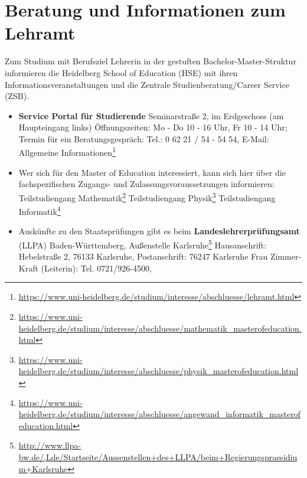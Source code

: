 \section{Beratung und Informationen zum Lehramt}
\label{lehramtkontakte}

Zum Studium mit Berufsziel Lehrerin in der gestuften Bachelor-Master-Struktur informieren die Heidelberg School of Education (HSE) mit ihren Informationsveranstaltungen und die Zentrale Studienberatung/Career Service (ZSB).
\begin{itemize}
    \item \textbf{Service Portal für Studierende} \newline
          Seminarstraße 2, im Erdgeschoss (am Haupteingang links)
          Öffnungszeiten: Mo - Do 10 - 16 Uhr, Fr 10 - 14 Uhr; \newline
          Termin für ein Beratungsgespräch: Tel.: 0 62 21 / 54 - 54 54, E-Mail:  \newline
          Allgemeine Informationen\footnote{\url{https://www.uni-heidelberg.de/studium/interesse/abschluesse/lehramt.html}}

    \item Wer sich für den Master of Education interessiert, kann sich hier über die fachspezifischen Zugangs- und Zulassungsvoraussetzungen informieren: \newline
          Teilstudiengang Mathematik\footnote{\url{https://www.uni-heidelberg.de/studium/interesse/abschluesse/mathematik_masterofeducation.html}} \newline
          Teilstudiengang Physik\footnote{\url{https://www.uni-heidelberg.de/studium/interesse/abschluesse/physik_masterofeducation.html}} \newline
          Teilstudiengang Informatik\footnote{\url{https://www.uni-heidelberg.de/studium/interesse/abschluesse/angewand_informatik_masterofeducation.html}}

    \item Auskünfte zu den Staatsprüfungen gibt es beim \textbf{Landeslehrerprüfungsamt} (LLPA) Baden-Württemberg, Außenstelle Karlsruhe\footnote{\url{http://www.llpa-bw.de/,Lde/Startseite/Aussenstellen+des+LLPA/beim+Regierungspraesidium+Karlsruhe}} \newline
          Hausanschrift: Hebelstraße 2, 76133 Karlsruhe, Postanschrift: 76247 Karlsruhe \newline
          Frau Zimmer-Kraft (Leiterin): Tel. 0721/926-4500, 


\end{itemize}
